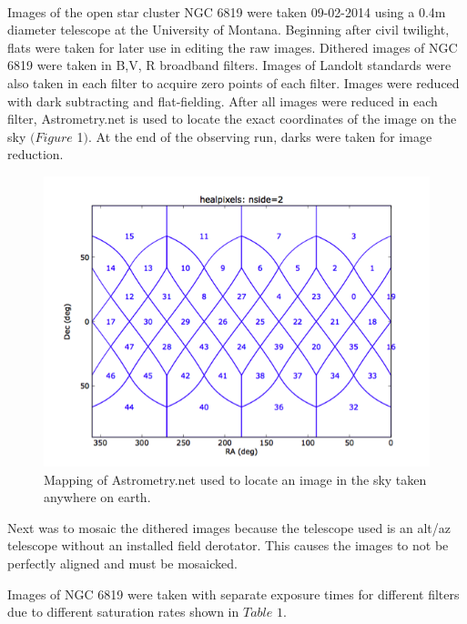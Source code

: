 \documentclass[11pt,twocolumn]{article}
\begin{document}
\ \

Images of the open star cluster NGC 6819 were taken 09-02-2014 using a 0.4m diameter telescope at the University of Montana. Beginning after civil twilight, flats were taken for later use in editing the raw images. Dithered images of NGC 6819 were taken in B,V, R broadband filters. Images of Landolt standards were also taken in each filter to acquire zero points of each filter. Images were reduced with dark subtracting and flat-fielding. After all images were reduced in each filter, Astrometry.net is used to locate the exact coordinates of the image on the sky $(Figure$ $ $1$)$. At the end of the observing run, darks were taken for image reduction.
\begin{center}
\begin{figure}
\includegraphics[scale=0.8]{Astrometry}
\caption{\small{Mapping of Astrometry.net used to locate an image in the sky taken anywhere on earth. }}
\end{figure}
\end{center}

Next was to mosaic the dithered images because the telescope used is an alt/az telescope without an installed field derotator. This causes the images to not be perfectly aligned and must be mosaicked. 

Images of NGC 6819 were taken with separate exposure times for different filters due to different saturation rates shown in $Table$ $1$.
\end{document}
